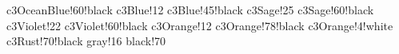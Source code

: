       {c3OceanBlue!60!black}%
 {c3Blue!12}%
 {c3Blue!45!black}%
     {c3Sage!25}%
     {c3Sage!60!black}%
    {c3Violet!22}%
    {c3Violet!60!black}%
    {c3Orange!12}%
    {c3Orange!78!black}%
    {c3Orange!4!white}%
    {c3Rust!70!black}%
     {gray!16}%
     {black!70}%
%
%
%
\providecommand{\cPale}  [1]{#1!4!white}%
\providecommand{\cLight} [1]{#1!8}%
\providecommand{\cFill}  [1]{#1!12}%
\providecommand{\cTok}   [1]{#1!22}%
\providecommand{\cSoft}  [1]{#1!50!gray}%
\providecommand{\cBorder}[1]{#1!50!black}%
%
